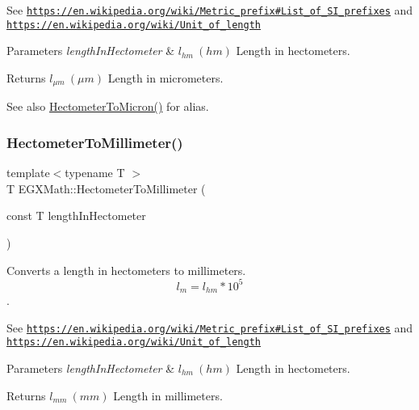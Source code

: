 See \href{https://en.wikipedia.org/wiki/Metric_prefix#List_of_SI_prefixes}{\tt https\+://en.\+wikipedia.\+org/wiki/\+Metric\+\_\+prefix\#\+List\+\_\+of\+\_\+\+S\+I\+\_\+prefixes} and \href{https://en.wikipedia.org/wiki/Unit_of_length}{\tt https\+://en.\+wikipedia.\+org/wiki/\+Unit\+\_\+of\+\_\+length} 
\begin{DoxyParams}{Parameters}
{\em length\+In\+Hectometer} & $ l_{hm}\ (hm)$ Length in hectometers. \\
\hline
\end{DoxyParams}
\begin{DoxyReturn}{Returns}
$ l_{\mu m}\ (\mu m)$ Length in micrometers. 
\end{DoxyReturn}
\begin{DoxySeeAlso}{See also}
\mbox{\hyperlink{group___e_g_x_math-_conversions-_length_conversions-_hectometer-_non-_s_i_ga997feaaeb91fc61c1d87c5d77fb7a665}{Hectometer\+To\+Micron()}} for alias. 
\end{DoxySeeAlso}
\mbox{\label{group___e_g_x_math-_conversions-_length_conversions-_hectometer-_s_i_gaa4255093ded6f7cb739f3c519881c294}} 
\subsubsection{\texorpdfstring{Hectometer\+To\+Millimeter()}{HectometerToMillimeter()}}
{\footnotesize\ttfamily template$<$typename T $>$ \\
T E\+G\+X\+Math\+::\+Hectometer\+To\+Millimeter (\begin{DoxyParamCaption}\item[{const T}]{length\+In\+Hectometer }\end{DoxyParamCaption})}



Converts a length in hectometers to millimeters. \[ l_{m}=l_{hm} * 10^{5} \]. 

See \href{https://en.wikipedia.org/wiki/Metric_prefix#List_of_SI_prefixes}{\tt https\+://en.\+wikipedia.\+org/wiki/\+Metric\+\_\+prefix\#\+List\+\_\+of\+\_\+\+S\+I\+\_\+prefixes} and \href{https://en.wikipedia.org/wiki/Unit_of_length}{\tt https\+://en.\+wikipedia.\+org/wiki/\+Unit\+\_\+of\+\_\+length} 
\begin{DoxyParams}{Parameters}
{\em length\+In\+Hectometer} & $ l_{hm}\ (hm)$ Length in hectometers. \\
\hline
\end{DoxyParams}
\begin{DoxyReturn}{Returns}
$ l_{mm}\ (mm)$ Length in millimeters. 
\end{DoxyReturn}
\mbox{\label{group___e_g_x_math-_conversions-_length_conversions-_hectometer-_s_i_gac9e19002288731e06d492cc5f8ee0a0e}} 
